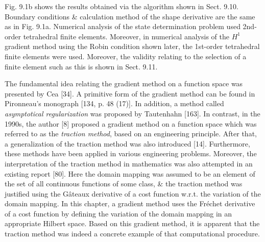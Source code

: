 \documentclass[oneside]{book}
\numberwithin{equation}{section}
\begin{document}
Fig. 9.1b shows the results obtained via the algorithm shown in Sect. 9.10. Boundary conditions \& calculation method of the shape derivative are the same as in Fig. 9.1a. Numerical analysis of the state determination problem used 2nd-order tetrahedral finite elements. Moreover, in numerical analysis of the $H^1$ gradient method using the Robin condition shown later, the 1st-order tetrahedral finite elements were used. Moreover, the validity relating to the selection of a finite element such as this is shown in Sect. 9.11.

The fundamental idea relating the gradient method on a function space was presented by Cea [34]. A primitive form of the gradient method can be found in Pironneau's monograph [134, p. 48 (17)]. In addition, a method called \textit{asymptotical regularization} was proposed by Tautenhahn [163]. In contrast, in the 1990s, the author [8] proposed a gradient method on a function space which was referred to as the \textit{traction method}, based on an engineering principle. After that, a generalization of the traction method was also introduced [14]. Furthermore, these methods have been applied in various engineering problems. Moreover, the interpretation of the traction method in mathematics was also attempted in an existing report [80]. Here the domain mapping was assumed to be an element of the set of all continuous functions of some class, \& the traction method was justified using the G\^ateaux derivative of a cost function w.r.t. the variation of the domain mapping. In this chapter, a gradient method uses the Fr\'echet derivative of a cost function by defining the variation of the domain mapping in an appropriate Hilbert space. Based on this gradient method, it is apparent that the traction method was indeed a concrete example of that computational procedure.
\end{document}
